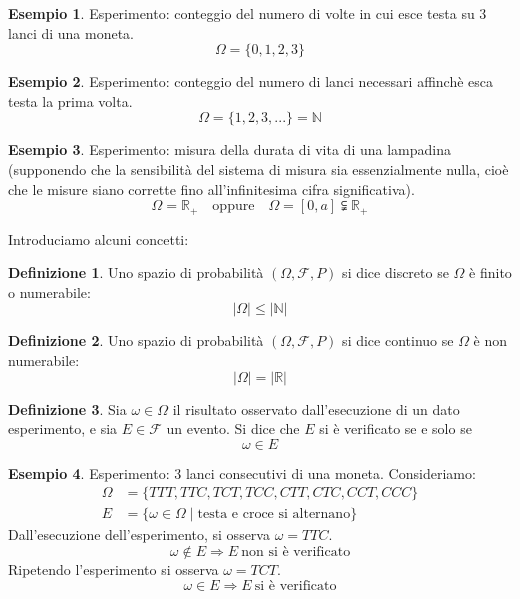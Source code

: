 \documentclass{article}
\theoremstyle{plain}
\theoremstyle{definition}
\newtheorem{definizione}{Definizione}[section]
\newtheorem{esempio}{Esempio}[section]
\theoremstyle{remark}
\begin{document}
\begin{esempio}
	Esperimento: conteggio del numero di volte in cui esce testa su 3 lanci di una moneta.
	\begin{equation*}
		\Omega=\{0,1,2,3\}
	\end{equation*}
\end{esempio}
\begin{esempio}
	Esperimento: conteggio del numero di lanci necessari affinchè esca testa la prima volta.
	\begin{equation*}
		\Omega=\{1,2,3,...\}=\mathbb{N}
	\end{equation*}
\end{esempio}
\begin{esempio}
	Esperimento: misura della durata di vita di una lampadina (supponendo che la sensibilità del sistema di misura sia essenzialmente nulla, cioè che le misure siano corrette fino all'infinitesima cifra significativa).
	\begin{equation*}
		\Omega=\mathds{R}_+\quad\text{oppure}\quad\Omega=[0,a]\subsetneqq\mathds{R}_+
	\end{equation*}
\end{esempio}
Introduciamo alcuni concetti:
\begin{definizione}
	Uno spazio di probabilità $(\Omega,\mathscr{F},P)$ si dice discreto se $\Omega$ è finito o numerabile:
	\begin{equation*}
		\lvert\Omega\rvert\leq\lvert\mathbb{N}\rvert
	\end{equation*}
\end{definizione}
\begin{definizione}
	Uno spazio di probabilità $(\Omega,\mathscr{F},P)$ si dice continuo se $\Omega$ è non numerabile:
	\begin{equation*}
		\lvert\Omega\rvert=\lvert\mathds{R}\rvert
	\end{equation*}
\end{definizione}
\begin{definizione}
	Sia $\omega\in\Omega$ il risultato osservato dall'esecuzione di un dato esperimento, e sia $E\in\mathscr{F}$ un evento. Si dice che $E$ si è verificato se e solo se 
	\begin{equation*}
		\omega\in E
	\end{equation*}
\end{definizione}
\begin{esempio}
	Esperimento: 3 lanci consecutivi di una moneta.
	Consideriamo:
	\begin{align*}
		\Omega&=\{TTT, TTC, TCT, TCC, CTT, CTC, CCT, CCC\}\\
		E&=\{\omega\in\Omega\mid\text{testa e croce si alternano}\}
	\end{align*}
	Dall'esecuzione dell'esperimento, si osserva $\omega=TTC$.
	\begin{equation*}
		\omega\notin E \Rightarrow E\ \text{non si è verificato}
	\end{equation*}
	Ripetendo l'esperimento si osserva $\omega=TCT$.
	\begin{equation*}
		\omega\in E \Rightarrow E\ \text{si è verificato}
	\end{equation*}
\end{esempio}
\end{document}
